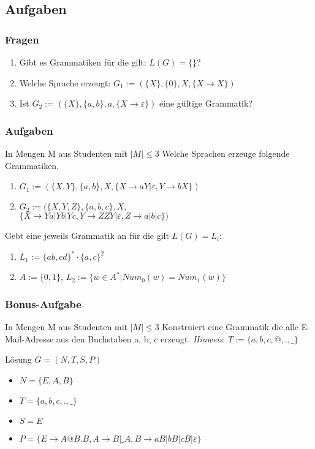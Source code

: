 \subsection{Aufgaben}
\begin{frame}
  \frametitle{Fragen}
  \begin{exampleblock}{}
    \begin{enumerate}
      \item Gibt es Grammatiken für die gilt: $L(G) = \{\}$?
      \item Welche Sprache erzeugt: $G_1 := (\{X\}, \{0\}, X, \{X \longrightarrow X\})$
      \item Ist $G_2 := (\{X\}, \{a, b\}, a, \{X \longrightarrow \varepsilon\})$ eine gültige Grammatik?
    \end{enumerate}
  \end{exampleblock}
\end{frame}
\begin{frame}
  \frametitle{Aufgaben}
  \begin{exampleblock}{In Mengen M aus Studenten mit $|M| \leq 3$}
    Welche Sprachen erzeuge folgende Grammatiken.
    \begin{enumerate}
      \item $G_1 := (\{X, Y\}, \{a, b\}, X, \{X \longrightarrow aY | \varepsilon, Y \longrightarrow bX\})$
      \item $G_2 := (\{X, Y, Z\}, \{a, b, c\}, X,$\\
             $\{X \longrightarrow Ya | Yb | Yc, Y \longrightarrow ZZY | \varepsilon, Z \longrightarrow a | b | c\})$
    \end{enumerate}
    Gebt eine jeweils Grammatik an für die gilt $L(G) = L_i$:
    \begin{enumerate}
      \item $L_1 := \{ab, cd\}^* \cdot \{a, c\}^2$
      \item $A := \{0, 1\}$, $L_2 := \{w  \in A^*| Num_0(w) = Num_1(w)\}$
    \end{enumerate}
  \end{exampleblock}
\end{frame}
\begin{frame}
  \frametitle{Bonus-Aufgabe}
  \begin{exampleblock}{In Mengen M aus Studenten mit $|M| \leq 3$}
    Konstruiert eine Grammatik die alle E-Mail-Adresse aus den Buchstaben {a, b, c} erzeugt.
    \emph{Hinweis}: $T := \{a, b, c, @, ., \_\}$
  \end{exampleblock}\pause
  \begin{exampleblock}{Lösung}
    $G = (N, T, S, P)$
    \begin{itemize}
      \item $N = \{E, A, B\}$
      \item $T = \{a, b, c, ., \_\}$
      \item $S = E$
      \item $P = \{E \longrightarrow A@B.B, A \longrightarrow B|\_A, B \longrightarrow aB | bB | cB | \varepsilon\}$
    \end{itemize}
  \end{exampleblock}
\end{frame}